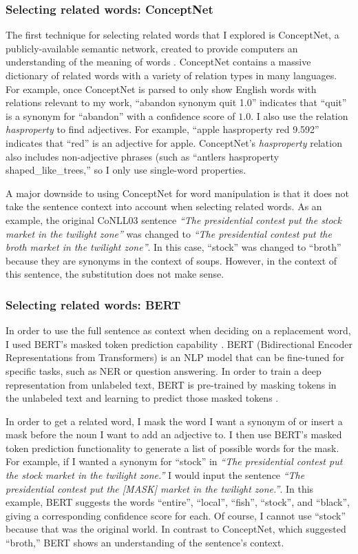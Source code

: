 \subsubsection{Selecting related words: ConceptNet}
The first technique for selecting related words that I explored is ConceptNet, a publicly-available semantic network, created to provide computers an understanding of the meaning of words \citep{conceptnet}. ConceptNet contains a massive dictionary of related words with a variety of relation types in many languages. For example, once ConceptNet is parsed to only show English words with relations relevant to my work, ``abandon synonym quit 1.0'' indicates that ``quit'' is a synonym for ``abandon'' with a confidence score of $1.0$. I also use the relation \textit{hasproperty} to find adjectives. For example, ``apple hasproperty red 9.592'' indicates that ``red'' is an adjective for apple. ConceptNet's \textit{hasproperty} relation also includes non-adjective phrases (such as ``antlers hasproperty shaped\_like\_trees,'' so I only use single-word properties.

A major downside to using ConceptNet for word manipulation is that it does not take the sentence context into account when selecting related words. As an example, the original CoNLL03 sentence \textit{``The presidential contest put the stock market in the twilight zone''} was changed to \textit{``The presidential contest put the broth market in the twilight zone''}. In this case, ``stock'' was changed to ``broth'' because they are synonyms in the context of soups. However, in the context of this sentence, the substitution does not make sense.

\subsubsection{Selecting related words: BERT}
\label{sec:BERT}
In order to use the full sentence as context when deciding on a replacement word, I used BERT's masked token prediction capability \citep{BERT}. BERT (Bidirectional Encoder Representations from Transformers) is an NLP model that can be fine-tuned for specific tasks, such as NER or question answering. In order to train a deep representation from unlabeled text, BERT is pre-trained by masking tokens in the unlabeled text and learning to predict those masked tokens \citep{BERT}. 

In order to get a related word, I mask the word I want a synonym of or insert a mask before the noun I want to add an adjective to. I then use BERT's masked token prediction functionality to generate a list of possible words for the mask. For example, if I wanted a synonym for ``stock'' in \textit{``The presidential contest put the stock market in the twilight zone.''} I would input the sentence \textit{``The presidential contest put the [MASK] market in the twilight zone.''}. In this example, BERT suggests the words ``entire'', ``local'', ``fish'', ``stock'', and ``black'', giving a corresponding confidence score for each. Of course, I cannot use ``stock'' because that was the original world. In contrast to ConceptNet, which suggested ``broth,'' BERT shows an understanding of the sentence's context.

